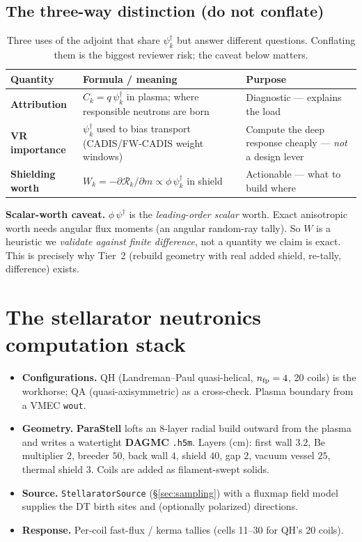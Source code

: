 \documentclass[11pt]{article}
\newcommand{\psid}{\psi^{\dagger}}
\newcommand{\R}{\mathcal{R}}
\begin{document}
\subsection{The three-way distinction (do not conflate)}
\begin{table}[h]\centering
\begin{tabular}{p{3.1cm}p{5.2cm}p{5.6cm}}
\toprule
Quantity & Formula / meaning & Purpose \\
\midrule
\textbf{Attribution} & $C_k=q\,\psid_k$ in plasma; where responsible neutrons are born &
Diagnostic --- explains the load \\
\textbf{VR importance} & $\psid_k$ used to bias transport (CADIS/FW-CADIS weight windows) &
Compute the deep response cheaply --- \emph{not} a design lever \\
\textbf{Shielding worth} & $W_k=-\partial\R_k/\partial m \propto \phi\,\psid_k$ in shield &
Actionable --- what to build where \\
\bottomrule
\end{tabular}
\caption{Three uses of the adjoint that share $\psid_k$ but answer different questions.
Conflating them is the biggest reviewer risk; the caveat below matters.}
\end{table}

\begin{key}
\textbf{Scalar-worth caveat.} $\phi\,\psid$ is the \emph{leading-order scalar} worth. Exact
anisotropic worth needs angular flux moments (an angular random-ray tally). So $W$ is a heuristic
we \emph{validate against finite difference}, not a quantity we claim is exact. This is precisely
why Tier~2 (rebuild geometry with real added shield, re-tally, difference) exists.
\end{key}

\section{The stellarator neutronics computation stack}
\label{sec:stack}

\begin{itemize}
\item \textbf{Configurations.} QH (Landreman--Paul quasi-helical, $n_{\rm fp}=4$, 20 coils) is the
  workhorse; QA (quasi-axisymmetric) as a cross-check. Plasma boundary from a VMEC \texttt{wout}.
\item \textbf{Geometry.} \textbf{ParaStell} lofts an 8-layer radial build outward from the plasma
  and writes a watertight \textbf{DAGMC} \texttt{.h5m}. Layers (cm): first wall $3.2$, Be
  multiplier $2$, breeder $50$, back wall $4$, shield $40$, gap $2$, vacuum vessel $25$, thermal
  shield $3$. Coils are added as filament-swept solids.
\item \textbf{Source.} \texttt{StellaratorSource} (\S\ref{sec:sampling}) with a fluxmap field
  model supplies the DT birth sites and (optionally polarized) directions.
\item \textbf{Response.} Per-coil fast-flux / kerma tallies (cells 11--30 for QH's 20 coils).
\end{itemize}
\end{document}
